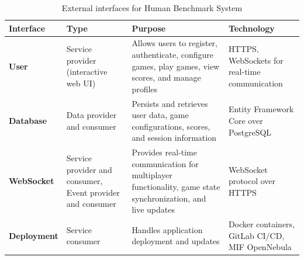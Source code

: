 \begin{table}[h!]
\centering
\begin{tabularx}{\textwidth}{|l|X|X|X|}
\hline
\textbf{Interface} & \textbf{Type} & \textbf{Purpose} & \textbf{Technology} \\
\hline
\textbf{User} & Service provider (interactive web UI) & Allows users to register, authenticate, configure games, play games, view scores, and manage profiles & HTTPS, WebSockets for real-time communication \\
\hline
\textbf{Database} & Data provider and consumer & Persists and retrieves user data, game configurations, scores, and session information & Entity Framework Core over PostgreSQL \\
\hline
\textbf{WebSocket} & Service provider and consumer, Event provider and consumer & Provides real-time communication for multiplayer functionality, game state synchronization, and live updates & WebSocket protocol over HTTPS \\
\hline
\textbf{Deployment} & Service consumer & Handles application deployment and updates & Docker containers, GitLab CI/CD, MIF OpenNebula \\
\hline
\end{tabularx}
\caption{External interfaces for Human Benchmark System}
\label{tab:external_interfaces}
\end{table}








